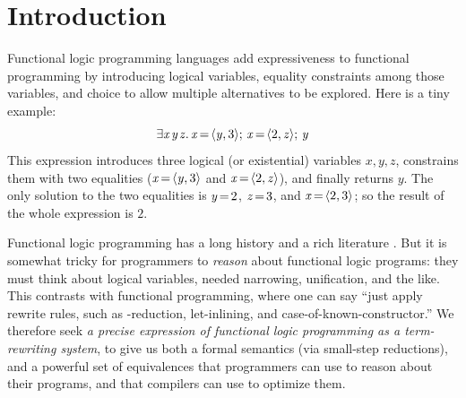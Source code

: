 \documentclass[acmsmall]{acmart}
\newcommand{\Varid}[1]{\mathit{#1}}
\newcommand{\eg}{\emph{e.g.}\xspace}
\begin{document}

\section{Introduction}

Functional logic programming languages add expressiveness to functional programming
by introducing logical variables, equality constraints among those variables,
and choice to allow multiple alternatives to be explored.  Here is a tiny example:
$$
\ensuremath{\exists\Varid{x}\hspace{0.1em}\Varid{y}\hspace{0.1em}\Varid{z}.\,\Varid{x}\hspace{-0.14em}=\hspace{-0.14em}\langle{}\Varid{y},\mathrm{3}\rangle;\,\Varid{x}\hspace{-0.14em}=\hspace{-0.14em}\langle{}\mathrm{2},\Varid{z}\rangle;\,\Varid{y}}
$$
This expression introduces three logical (or existential) variables \ensuremath{\Varid{x},\Varid{y},\Varid{z}},
constrains them with two equalities (\ensuremath{\Varid{x}\hspace{-0.14em}=\hspace{-0.14em}\langle{}\Varid{y},\mathrm{3}\rangle} and \ensuremath{\Varid{x}\hspace{-0.14em}=\hspace{-0.14em}\langle{}\mathrm{2},\Varid{z}\rangle}), and finally returns \ensuremath{\Varid{y}}.
The only solution to the two equalities is \ensuremath{\Varid{y}\hspace{-0.14em}=\hspace{-0.14em}\mathrm{2}}, \ensuremath{\Varid{z}\hspace{-0.14em}=\hspace{-0.14em}\mathrm{3}}, and \ensuremath{\Varid{x}\hspace{-0.14em}=\hspace{-0.14em}\langle{}\mathrm{2},\mathrm{3}\rangle}; so the result of the
whole expression is \ensuremath{\mathrm{2}}.

Functional logic programming has a long history and a rich literature \cite{antoy-hanus:survey}.
But it is somewhat tricky for programmers to \emph{reason} about
functional logic programs: they must think about logical variables,
needed narrowing, unification, and the like.
This contrasts with functional programming, where one can say ``just apply
rewrite rules, such as \textbeta-reduction, let-inlining, and
case-of-known-constructor.''
We therefore seek \emph{a precise expression of functional logic programming as
a term-rewriting system}, to give us both a formal semantics (via small-step reductions),
and a powerful set of equivalences that programmers can use to reason about their programs,
and that compilers can use to optimize them.
\end{document}
